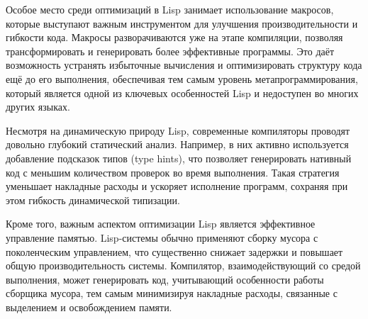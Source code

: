 Особое место среди оптимизаций в Lisp занимает использование макросов, которые выступают важным инструментом для улучшения производительности и гибкости кода. Макросы разворачиваются уже на этапе компиляции, позволяя трансформировать и генерировать более эффективные программы. Это даёт возможность устранять избыточные вычисления и оптимизировать структуру кода ещё до его выполнения, обеспечивая тем самым уровень метапрограммирования, который является одной из ключевых особенностей Lisp и недоступен во многих других языках.

Несмотря на динамическую природу Lisp, современные компиляторы проводят довольно глубокий статический анализ. Например, в них активно используется добавление подсказок типов (type hints), что позволяет генерировать нативный код с меньшим количеством проверок во время выполнения. Такая стратегия уменьшает накладные расходы и ускоряет исполнение программ, сохраняя при этом гибкость динамической типизации.

Кроме того, важным аспектом оптимизации Lisp является эффективное управление памятью. Lisp-системы обычно применяют сборку мусора с поколенческим управлением, что существенно снижает задержки и повышает общую производительность системы. Компилятор, взаимодействующий со средой выполнения, может генерировать код, учитывающий особенности работы сборщика мусора, тем самым минимизируя накладные расходы, связанные с выделением и освобождением памяти.
